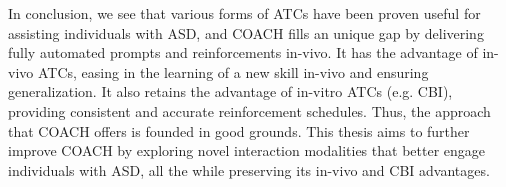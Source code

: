In conclusion, we see that various forms of ATCs have been proven useful for assisting individuals with ASD, and COACH fills an unique gap by delivering fully automated prompts and reinforcements in-vivo.  It has the advantage of in-vivo ATCs, easing in the learning of a new skill in-vivo and ensuring generalization.  It also retains the advantage of in-vitro ATCs (e.g. CBI), providing consistent and accurate reinforcement schedules.  Thus, the approach that COACH offers is founded in good grounds.  This thesis aims to further improve COACH by exploring novel interaction modalities that better engage individuals with ASD, all the while preserving its in-vivo and CBI advantages.